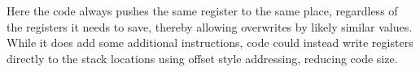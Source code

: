 Here the code always pushes the same register to the same place, regardless of
the registers it needs to save, thereby allowing overwrites by likely similar values.
While it does add some additional instructions,
code could instead write registers directly to the stack locations using offset
style addressing, reducing code size.

